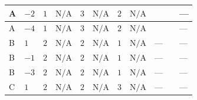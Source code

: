 \documentclass[8pt]{article}
\begin{document}
\begin{landscape}
\begin{longtable}{@{}llcccccc >{\raggedright\arraybackslash}p{0.21\linewidth} >{\raggedright\arraybackslash}p{0.21\linewidth} >{\raggedright\arraybackslash}p{0.21\linewidth}@{}}
\midrule
A & $-2$ & $1$ & $\text{N/A}$ & $3$ & $\text{N/A}$ & $2$ & $\text{N/A}$ & \scriptsize\adjustbox{max width=\linewidth}{$\begin{gathered} {\lambda_{HS_2}^{(1)}} (6 \operatorname{Tr}\!\left({Y_d}\,\left({Y_d}\right)^{\dagger}\right)+2 \operatorname{Tr}\!\left({Y_e}\,\left({Y_e}\right)^{\dagger}\right)+6 \operatorname{Tr}\!\left({Y_u}\,\left({Y_u}\right)^{\dagger}\right)+4 {\lambda_{S_2}^{(A)}})\end{gathered}$} & \scriptsize\adjustbox{max width=\linewidth}{$\begin{gathered} +4 {\lambda_5} \left({\lambda_5}\right)^{*}\end{gathered}$} & --- \\
\midrule
A & $-4$ & $1$ & $\text{N/A}$ & $3$ & $\text{N/A}$ & $2$ & $\text{N/A}$ & \scriptsize\adjustbox{max width=\linewidth}{$\begin{gathered} {\lambda_{HS_2}^{(1)}} (6 \operatorname{Tr}\!\left({Y_d}\,\left({Y_d}\right)^{\dagger}\right)+2 \operatorname{Tr}\!\left({Y_e}\,\left({Y_e}\right)^{\dagger}\right)+6 \operatorname{Tr}\!\left({Y_u}\,\left({Y_u}\right)^{\dagger}\right)+4 {\lambda_{S_2}^{(A)}})\end{gathered}$} & \scriptsize\adjustbox{max width=\linewidth}{$\begin{gathered} +4 {\lambda_5} \left({\lambda_5}\right)^{*}\end{gathered}$} & --- \\
\midrule
B & $1$ & $2$ & $\text{N/A}$ & $2$ & $\text{N/A}$ & $1$ & $\text{N/A}$ & --- & \scriptsize\adjustbox{max width=\linewidth}{$\begin{gathered} +6 {\lambda_5} \left({\lambda_5}\right)^{*}\end{gathered}$} & --- \\
\midrule
B & $-1$ & $2$ & $\text{N/A}$ & $2$ & $\text{N/A}$ & $1$ & $\text{N/A}$ & --- & \scriptsize\adjustbox{max width=\linewidth}{$\begin{gathered} +6 {\lambda_5} \left({\lambda_5}\right)^{*}\end{gathered}$} & --- \\
\midrule
B & $-3$ & $2$ & $\text{N/A}$ & $2$ & $\text{N/A}$ & $1$ & $\text{N/A}$ & --- & \scriptsize\adjustbox{max width=\linewidth}{$\begin{gathered} +6 {\lambda_5} \left({\lambda_5}\right)^{*}\end{gathered}$} & --- \\
\midrule
C & $1$ & $2$ & $\text{N/A}$ & $2$ & $\text{N/A}$ & $3$ & $\text{N/A}$ & --- & \scriptsize\adjustbox{max width=\linewidth}{$\begin{gathered} +6 {\lambda_5} \left({\lambda_5}\right)^{*}\end{gathered}$} & --- \\

\end{longtable}
\end{landscape}
\end{document}
